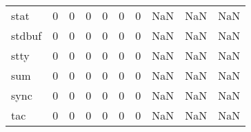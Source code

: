 \begin{longtable}{lrrrrrrrrr}
stat      &                                       0 &                                                  0 &                                                  0 &                                                  0 &                                                  0 &                                                  0 &                                                NaN &                                    NaN &                                  NaN \\
stdbuf    &                                       0 &                                                  0 &                                                  0 &                                                  0 &                                                  0 &                                                  0 &                                                NaN &                                    NaN &                                  NaN \\
stty      &                                       0 &                                                  0 &                                                  0 &                                                  0 &                                                  0 &                                                  0 &                                                NaN &                                    NaN &                                  NaN \\
sum       &                                       0 &                                                  0 &                                                  0 &                                                  0 &                                                  0 &                                                  0 &                                                NaN &                                    NaN &                                  NaN \\
sync      &                                       0 &                                                  0 &                                                  0 &                                                  0 &                                                  0 &                                                  0 &                                                NaN &                                    NaN &                                  NaN \\
tac       &                                       0 &                                                  0 &                                                  0 &                                                  0 &                                                  0 &                                                  0 &                                                NaN &                                    NaN &                                  NaN \\

\end{longtable}
